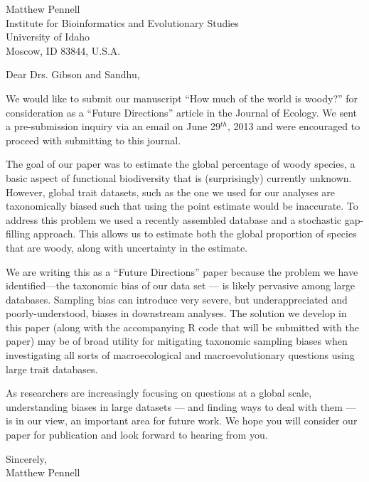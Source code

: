 \documentclass[a4paper,12pt]{article}
\begin{document}
{\raggedleft
  Matthew Pennell\\
  Institute for Bioinformatics and Evolutionary Studies\\
  University of Idaho\\
 Moscow, ID 83844, U.S.A.\\[2ex]
}

\vspace{3ex}

Dear Drs. Gibson and Sandhu,

We would like to submit our manuscript ``How much of the world is woody?'' for consideration as a ``Future Directions'' article in the Journal of Ecology. We sent a pre-submission inquiry via an email on June 29$^{th}$, 2013 and were encouraged to proceed with submitting to this journal.
					
The goal of our paper was to estimate the global percentage of woody species, a basic aspect of functional biodiversity that is (surprisingly) currently unknown. However, global trait datasets, such as the one we used for our analyses are taxonomically biased such that using the point estimate would be inaccurate. To address this problem we used a recently assembled database and a stochastic gap-filling approach. This allows us to estimate both the global proportion of species that are woody, along with uncertainty in the estimate. 

We are writing this as a ``Future Directions'' paper because the problem we have identified—the taxonomic bias of our data set --- is likely pervasive among large databases. Sampling bias can introduce very severe, but underappreciated and poorly-understood, biases in downstream analyses. The solution we develop in this paper (along with the accompanying R code that will be submitted with the paper) may be of broad utility for mitigating taxonomic sampling biases when investigating all sorts of macroecological and macroevolutionary questions using large trait databases.

As researchers are increasingly focusing on questions at a global scale, understanding biases in large datasets --- and finding ways to deal with them --- is in our view, an important area for future work. We hope you will consider our paper for publication and look forward to hearing from you.

\begin{flushright}
\vspace{2ex}
\hspace{.2\textwidth}Sincerely,\\
\hspace*{.3\textwidth}
Matthew Pennell
\end{flushright}
\end{document}
